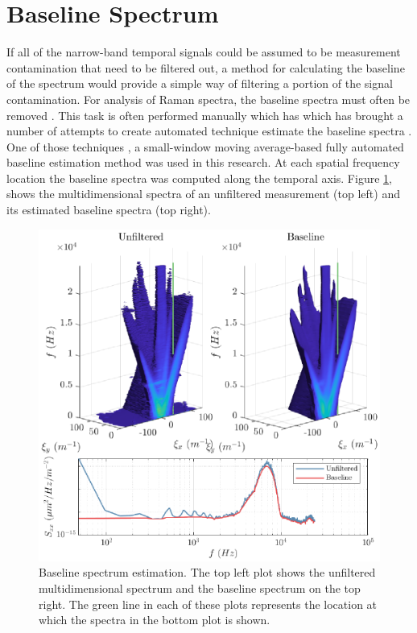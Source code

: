 \section{Baseline Spectrum}
\label{chap:06_baseline}
If all of the narrow-band temporal signals could be assumed to be measurement contamination that need to be filtered out, a method for calculating the baseline of the spectrum would provide a simple way of filtering a portion of the signal contamination.
For analysis of Raman spectra, the baseline spectra must often be removed \cite{Schulze-2012-GmyAqzC7}.
This task is often performed manually which has which has brought a number of attempts to create automated technique estimate the baseline spectra \cite{Mosier-Boss-1995-keK3ckUN, Schulze-2005-QkUeywxD, Schulze-2012-GmyAqzC7, Zhao-2007-HAc6j8Wb}.
One of those techniques \cite{Schulze-2012-GmyAqzC7}, a small-window moving average-based fully automated baseline estimation method was used in this research.
At each spatial frequency location the baseline spectra was computed along the temporal axis.
Figure \ref{fig:06_filter_baseline}, shows the multidimensional spectra of an unfiltered measurement (top left) and its estimated baseline spectra (top right).
\begin{figure}
  \centering
  \includegraphics{../matlab/06_single_sensor_filtering/filter_baseline.eps}
  \caption{Baseline spectrum estimation. The top left plot shows the unfiltered multidimensional spectrum and the baseline spectrum on the top right. The green line in each of these plots represents the location at which the spectra in the bottom plot is shown.}
  \label{fig:06_filter_baseline}
\end{figure}
